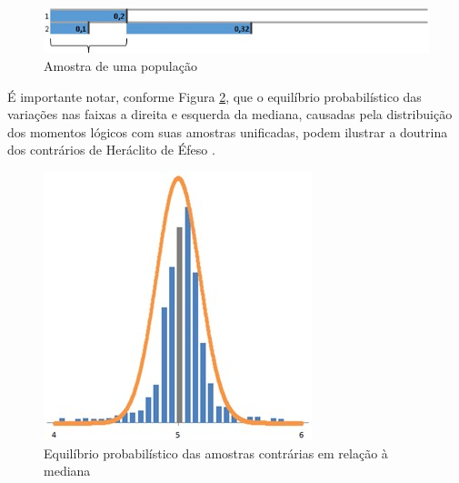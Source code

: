 \begin{figure}[H]
\caption{Amostra de uma população}
\label{fig:logical_subunits}
\centering
\includegraphics[scale=1]{sections/images/logical_subunits.jpg}
\end{figure}

É importante notar, conforme Figura \ref{fig:trend_chart_of_normal_distribution}, que o equilíbrio probabilístico das variações nas faixas a direita e esquerda da mediana, causadas pela distribuição dos momentos lógicos com suas amostras unificadas, podem ilustrar a doutrina dos contrários de Heráclito de Éfeso \cite{brasilescola_heraclito}.

\begin{figure}[H]
\caption{Equilíbrio probabilístico das amostras contrárias em relação à mediana}
\label{fig:trend_chart_of_normal_distribution}
\centering
\includegraphics[scale=1.1]{sections/images/trend_chart_of_normal_distribution.jpg}
\end{figure}

